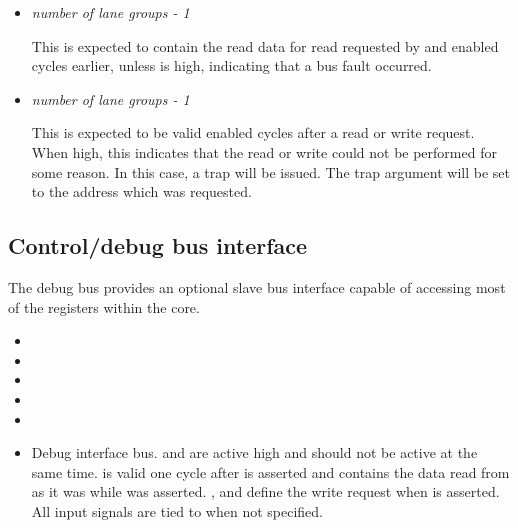 \documentclass[main.tex]{subfiles}
\begin{document}
\begin{itemize}
  \vspace{1em}
  \item {}\textit{number of lane groups - 1}
  
  This is expected to contain the read data for read requested by  and   enabled cycles earlier, unless  is high, indicating that a bus fault occurred.

  \vspace{1em}
  \item {}\textit{number of lane groups - 1}
  
  This is expected to be valid  enabled cycles after a read or write request. When high, this indicates that the read or write could not be performed for some reason. In this case, a  trap will be issued. The trap argument will be set to the address which was requested.
  
\end{itemize}

\subsection{Control/debug bus interface}

The debug bus provides an optional slave bus interface capable of accessing most of the registers within the core.

\begin{itemize}
  
  \item {}
  \item {}
  \item {}
  \item {}
  \item {}
  \item {}
  
  Debug interface bus.  and  are active high and should not be active at the same time.  is valid one cycle after  is asserted and contains the data read from  as it was while  was asserted. ,  and  define the write request when  is asserted. All input signals are tied to  when not specified.
  
\end{itemize}
\end{document}
